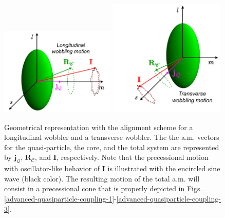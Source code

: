 \begin{figure}
    \centering
    \includegraphics[width=0.49\textwidth]{Chapters/Figures/longitudinal_wobbler-schematic.pdf}
    \includegraphics[width=0.49\textwidth]{Chapters/Figures/transverse_wobbler-schematic.pdf}
    \caption{Geometrical representation with the alignment scheme for a longitudinal wobbler and a transverse wobbler. The the a.m. vectors for the quasi-particle, the core, and the total system are represented by $\mathbf{j}_\mathcal{Q}$, $\mathbf{R}_\mathscr{C}$, and $\mathbf{I}$, respectively. Note that the precessional motion with oscillator-like behavior of $\mathbf{I}$ is illustrated with the encircled sine wave (black color). The resulting motion of the total a.m. will consist in a precessional cone that is properly depicted in Figs. \ref{advanced-quasiparticle-coupling-1}-\ref{advanced-quasiparticle-coupling-3}.}
    \label{wobbling-oddA-geometry}
\end{figure}
